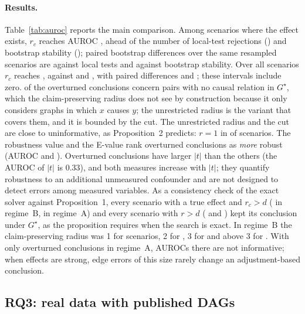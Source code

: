 \documentclass[11pt]{article}
\begin{document}
\paragraph{Results.} Table~\ref{tab:auroc} reports the main comparison. Among scenarios where the effect exists, $r_c$ reaches AUROC \BRcAUC{}, ahead of the number of local-test rejections (\BLtAUC{}) and bootstrap stability (\BBootAUC{}); paired bootstrap differences over the same resampled scenarios are \BDiffLtAnc{} against local tests and \BDiffBootAnc{} against bootstrap stability. Over all \BN{} scenarios $r_c$ reaches \BRcAUCall{}, against \BLtAUCall{} and \BBootAUCall{}, with paired differences \BDiffLtAll{} and \BDiffBootAll{}; these intervals include zero. \BNullPos{} of the \BPos{} overturned conclusions concern pairs with no causal relation in $G^\star$, which the claim-preserving radius does not see by construction because it only considers graphs in which $x$ causes $y$; the unrestricted radius is the variant that covers them, and it is bounded by the cut. The unrestricted radius and the cut are close to uninformative, as Proposition~2 predicts: $r=1$ in \BRaOne{} of \BN{} scenarios. The robustness value and the E-value rank overturned conclusions as \emph{more} robust (AUROC \BRVAUC{} and \BEvAUC{}). Overturned conclusions have larger $|t|$ than the others (the AUROC of $|t|$ is 0.33), and both measures increase with $|t|$; they quantify robustness to an additional unmeasured confounder and are not designed to detect errors among measured variables. As a consistency check of the exact solver against Proposition~1, every scenario with a true effect and $r_c>d$ (\BCertClaimN{} in regime~B, \ACertClaimN{} in regime~A) and every scenario with $r>d$ (\BCertAllN{} and \ACertAllN{}) kept its conclusion under $G^\star$, as the proposition requires when the search is exact. In regime~B the claim-preserving radius was 1 for \BRcOne{} scenarios, 2 for \BRcTwo{}, 3 for \BRcThree{} and above 3 for \BRcGtThree{}. With only \APos{} overturned conclusions in regime~A, AUROCs there are not informative; when effects are strong, edge errors of this size rarely change an adjustment-based conclusion.

\subsection{RQ3: real data with published DAGs}\label{sec:real}
\end{document}
